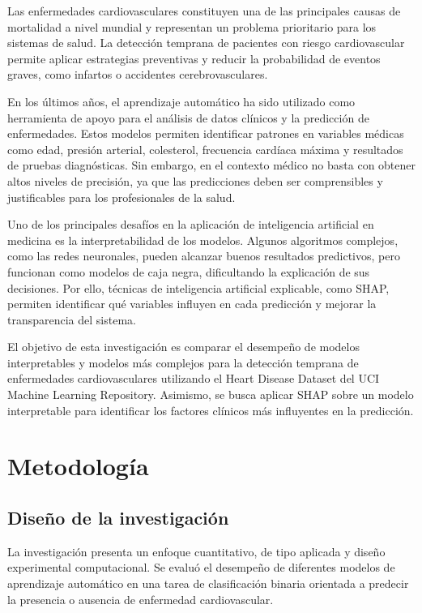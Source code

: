 \documentclass[conference]{IEEEtran}
\begin{document}
Las enfermedades cardiovasculares constituyen una de las principales causas de mortalidad a nivel mundial y representan un problema prioritario para los sistemas de salud. La detección temprana de pacientes con riesgo cardiovascular permite aplicar estrategias preventivas y reducir la probabilidad de eventos graves, como infartos o accidentes cerebrovasculares.

En los últimos años, el aprendizaje automático ha sido utilizado como herramienta de apoyo para el análisis de datos clínicos y la predicción de enfermedades. Estos modelos permiten identificar patrones en variables médicas como edad, presión arterial, colesterol, frecuencia cardíaca máxima y resultados de pruebas diagnósticas. Sin embargo, en el contexto médico no basta con obtener altos niveles de precisión, ya que las predicciones deben ser comprensibles y justificables para los profesionales de la salud.

Uno de los principales desafíos en la aplicación de inteligencia artificial en medicina es la interpretabilidad de los modelos. Algunos algoritmos complejos, como las redes neuronales, pueden alcanzar buenos resultados predictivos, pero funcionan como modelos de caja negra, dificultando la explicación de sus decisiones. Por ello, técnicas de inteligencia artificial explicable, como SHAP, permiten identificar qué variables influyen en cada predicción y mejorar la transparencia del sistema.

El objetivo de esta investigación es comparar el desempeño de modelos interpretables y modelos más complejos para la detección temprana de enfermedades cardiovasculares utilizando el Heart Disease Dataset del UCI Machine Learning Repository. Asimismo, se busca aplicar SHAP sobre un modelo interpretable para identificar los factores clínicos más influyentes en la predicción.

\section{Metodología}

\subsection{Diseño de la investigación}

La investigación presenta un enfoque cuantitativo, de tipo aplicada y diseño experimental computacional. Se evaluó el desempeño de diferentes modelos de aprendizaje automático en una tarea de clasificación binaria orientada a predecir la presencia o ausencia de enfermedad cardiovascular.
\end{document}
